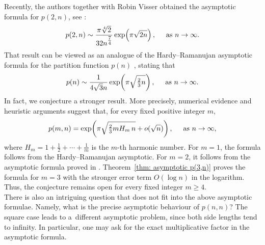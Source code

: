 \documentclass[12pt,a4paper]{amsart}
\numberwithin{equation}{section}
\theoremstyle{plain}
\theoremstyle{definition}
\theoremstyle{remark}
\begin{document}

Recently, the authors together with Robin Visser obtained the asymptotic formula for $p(2,n)$, see \cite[Theorem 1.5]{GVZ2026}:
$$
p(2,n)\sim
\frac{\pi\sqrt[4]{2}}{32n^{\tfrac{7}{4}}}
\exp\!\left(\pi\sqrt{2n}\right),
\hspace{0.5cm}\text{as }n\to\infty.
$$
That result can be viewed as an analogue of the Hardy–Ramanujan asymptotic formula for the partition function $p(n)$ \cite{HardyRamanujan}, stating that
$$
p(n)\sim
\frac{1}{4\sqrt{3}n}
\exp\!\left(\pi\sqrt{\tfrac{2}{3}n}\right),
\hspace{0.5cm}\text{as }n\to\infty.
$$
In fact, we conjecture a stronger result. More precisely, numerical evidence and heuristic arguments suggest that, for every fixed positive integer $m$,
\begin{equation}\label{conjH}
p(m,n)=\exp\!\left(
\pi\sqrt{\tfrac{2}{3}mH_m\,n}+o(\sqrt n)
\right),\hspace{0.5cm}\text{as }n\to\infty,
\end{equation}
where
$
H_m=
1+\frac12+\cdots+\frac1m
$
is the $m$-th harmonic number. For $m=1$, the formula follows from the Hardy--Ramanujan asymptotic. For $m=2$, it follows from the asymptotic formula proved in \cite[Theorem~1.5]{GVZ2026}. Theorem~\ref{thm: asymptotic p(3,n)} proves the formula for $m=3$ with the stronger error term $O(\log n)$ in the logarithm. Thus, the conjecture remains open for every fixed integer $m\ge 4$.\\
There is also an intriguing question that does not fit into the above asymptotic formulae. Namely, what is the precise asymptotic behaviour of $p(n,n)$? The square case leads to a~different asymptotic problem, since both side lengths tend to infinity. In particular, one may ask for the exact multiplicative factor in the asymptotic formula.\\

\end{document}
